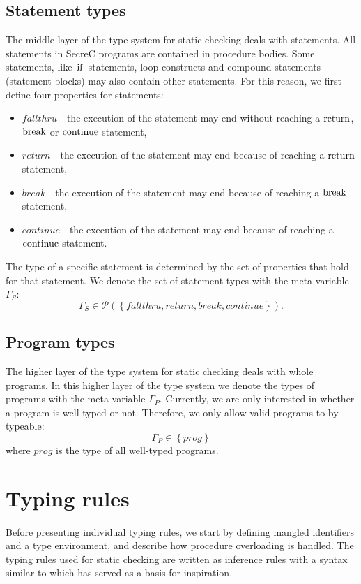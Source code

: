 \documentclass[a4paper, 10pt, draft]{report}
\newcommand{\mycode}[1]{\ensuremath{\mbox{\lstinline{#1}}}}
\begin{document}
\subsection{Statement types}
The middle layer of the type system for static checking deals with statements.
All statements in SecreC programs are contained in procedure bodies. Some
statements, like \mycode{if}-statements, loop constructs and compound
statements (statement blocks) may also contain other statements. For this
reason, we first define four properties for statements:
\begin{itemize}
\item $fallthru$ - the execution of the statement may end without reaching a
\mycode{return}, \mycode{break} or \mycode{continue} statement,
\item $return$ - the execution of the statement may end because of reaching a
\mycode{return} statement,
\item $break$ - the execution of the statement may end because of reaching a
\mycode{break} statement,
\item $continue$ - the execution of the statement may end because of reaching a
\mycode{continue} statement.
\end{itemize}

The type of a specific statement is determined by the set of properties that
hold for that statement. We denote the set of statement types with the
meta-variable $\Gamma_S$:
\[
\Gamma_S \in \mathcal{P}\!\left(\left\{ fallthru, return, break, continue \right\}\right).
\]

\subsection{Program types}
The higher layer of the type system for static checking deals with whole
programs. In this higher layer of the type system we denote the types of
programs with the meta-variable $\Gamma_P$. Currently, we are only interested
in whether a program is well-typed or not. Therefore, we only allow valid
programs to by typeable:
\[
\Gamma_P \in \left\{prog\right\}
\]
where $prog$ is the type of all well-typed programs.

\section{Typing rules}\label{sec:checking:typing}

Before presenting individual typing rules, we start by defining mangled
identifiers and a type environment, and describe how procedure overloading is
handled. The typing rules used for static checking are written as inference
rules with a syntax similar to \cite{VSI96} which has served as a basis for
inspiration.
\end{document}
